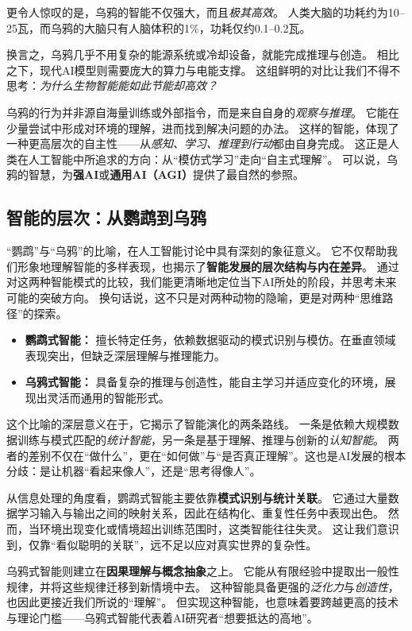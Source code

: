 更令人惊叹的是，乌鸦的智能不仅强大，而且\emph{极其高效}。
人类大脑的功耗约为10--25瓦，而乌鸦的大脑只有人脑体积的1\%，功耗仅约0.1--0.2瓦。

换言之，乌鸦几乎不用复杂的能源系统或冷却设备，就能完成推理与创造。
相比之下，现代AI模型则需要庞大的算力与电能支撑。
这组鲜明的对比让我们不得不思考：\emph{为什么生物智能能如此节能却高效？}

乌鸦的行为并非源自海量训练或外部指令，而是来自自身的\emph{观察与推理}。
它能在少量尝试中形成对环境的理解，进而找到解决问题的办法。
这样的智能，体现了一种更高层次的自主性——从\emph{感知、学习、推理到行动}都由自身完成。
这正是人类在人工智能中所追求的方向：从“模仿式学习”走向“自主式理解”。
可以说，乌鸦的智慧，为\textbf{强AI}或\textbf{通用AI（AGI）}提供了最自然的参照。

\subsection{智能的层次：从鹦鹉到乌鸦}

“鹦鹉”与“乌鸦”的比喻，在人工智能讨论中具有深刻的象征意义。
它不仅帮助我们形象地理解智能的多样表现，也揭示了\textbf{智能发展的层次结构与内在差异}。
通过对这两种智能模式的比较，我们能更清晰地定位当下AI所处的阶段，并思考未来可能的突破方向。
换句话说，这不只是对两种动物的隐喻，更是对两种“思维路径”的探索。

\begin{itemize}
\item \textbf{鹦鹉式智能：} 擅长特定任务，依赖数据驱动的模式识别与模仿。在垂直领域表现突出，但缺乏深层理解与推理能力。
\item \textbf{乌鸦式智能：} 具备复杂的推理与创造性，能自主学习并适应变化的环境，展现出灵活而通用的智能形式。
\end{itemize}

这个比喻的深层意义在于，它揭示了智能演化的两条路线。
一条是依赖大规模数据训练与模式匹配的\emph{统计智能}，另一条是基于理解、推理与创新的\emph{认知智能}。
两者的差别不仅在“做什么”，更在“如何做”与“是否真正理解”。这也是AI发展的根本分歧：是让机器“看起来像人”，还是“思考得像人”。

从信息处理的角度看，鹦鹉式智能主要依靠\textbf{模式识别与统计关联}。
它通过大量数据学习输入与输出之间的映射关系，因此在结构化、重复性任务中表现出色。
然而，当环境出现变化或情境超出训练范围时，这类智能往往失灵。
这让我们意识到，仅靠“看似聪明的关联”，远不足以应对真实世界的复杂性。

乌鸦式智能则建立在\textbf{因果理解与概念抽象}之上。
它能从有限经验中提取出一般性规律，并将这些规律迁移到新情境中去。
这种智能具备更强的\emph{泛化力}与\emph{创造性}，也因此更接近我们所说的“理解”。
但实现这种智能，也意味着要跨越更高的技术与理论门槛——乌鸦式智能代表着AI研究者“想要抵达的高地”。


